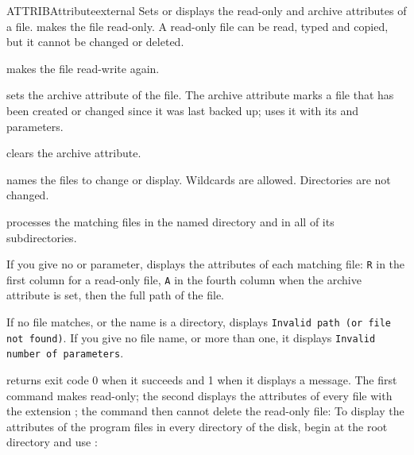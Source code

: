 
\begin{DosEntry}{ATTRIB}{Attribute}{external}
\Purpose Sets or displays the read-only and archive attributes of a file.
\Format {}
\Remarks
{} makes the file read-only.  A read-only file can be read, typed
and copied, but it cannot be changed or deleted.

 makes the file read-write again.

 sets the archive attribute of the file.  The archive attribute
marks a file that has been created or changed since it was last backed up;
 uses it with its  and  parameters.

 clears the archive attribute.

 names the files to change or display.  Wildcards are
allowed.  Directories are not changed.

 processes the matching files in the named directory and in all
of its subdirectories.

If you give no \kw{+} or \kw{-} parameter,  displays the
attributes of each matching file: \texttt{R} in the first column for a
read-only file, \texttt{A} in the fourth column when the archive attribute is
set, then the full path of the file.

If no file matches, or the name is a directory,  displays
\texttt{Invalid path (or file not found)}.  If you give no file name, or
more than one, it displays \texttt{Invalid number of parameters}.

 returns exit code 0 when it succeeds and 1 when it displays a
message.
\Example
The first command makes  read-only; the second displays the
attributes of every file with the extension ; the 
command then cannot delete the read-only file:
To display the attributes of the program files in every directory of the
disk, begin at the root directory and use :
\end{DosEntry}


